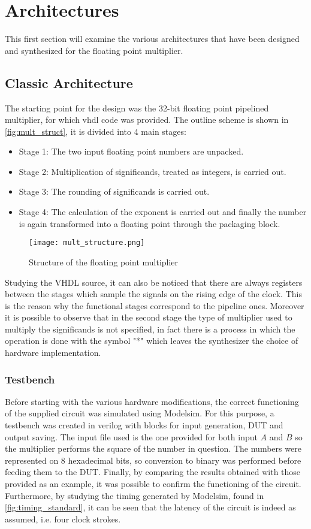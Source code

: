 \section{Architectures}
This first section will examine the various architectures that have been designed and synthesized for the floating point multiplier.

\subsection{Classic Architecture}
The starting point for the design was the 32-bit floating point pipelined multiplier, for which vhdl code was provided.
The outline scheme is shown in \autoref{fig:mult_struct}, it is divided into 4 main stages:
\begin{itemize}
\item Stage 1: The two input floating point numbers are unpacked.
\item Stage 2: Multiplication of significands, treated as integers, is carried out.
\item Stage 3: The rounding of significands is carried out.
\item Stage 4: The calculation of the exponent is carried out and finally the number is again transformed into a floating point through the packaging block.
\end{itemize}

\begin{figure}[h]
	\center
	\texttt{[image: mult\_structure.png]}
	\caption{Structure of the floating point multiplier}
	\label{fig:mult_struct}
\end{figure}

\noindent Studying the VHDL source, it can also be noticed that there are always registers between the stages which sample the signals on the rising edge of the clock. This is the reason why the functional stages correspond to the pipeline ones.
Moreover it is possible to observe that in the second stage the type of multiplier used to multiply the significands is not specified, in fact there is a process in which the operation is done with the symbol "*" which leaves the synthesizer the choice of hardware implementation.

\subsubsection{Testbench}
Before starting with the various hardware modifications, the correct functioning of the supplied circuit was simulated using Modelsim. For this purpose, a testbench was created in verilog with blocks for input generation, DUT and output saving.
The input file used is the one provided for both input $A$ and $B$ so the multiplier performs the square of the number in question. The numbers were represented on 8 hexadecimal bits, so conversion to binary was performed before feeding them to the DUT.
Finally, by comparing the results obtained with those provided as an example, it was possible to confirm the functioning of the circuit. Furthermore, by studying the timing generated by Modelsim, found in \autoref{fig:timing_standard}, it can be seen that the latency of the circuit is indeed as assumed, i.e. four clock strokes.

